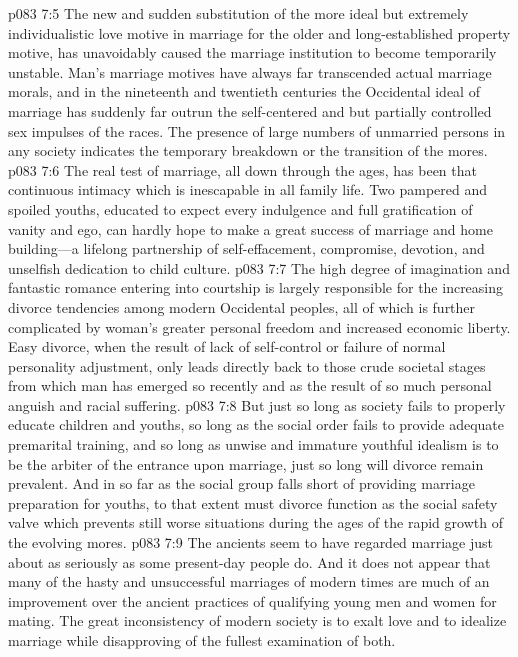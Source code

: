 \vs p083 7:5 The new and sudden substitution of the more ideal but extremely individualistic love motive in marriage for the older and long\hyp{}established property motive, has unavoidably caused the marriage institution to become temporarily unstable. Man’s marriage motives have always far transcended actual marriage morals, and in the nineteenth and twentieth centuries the Occidental ideal of marriage has suddenly far outrun the self\hyp{}centered and but partially controlled sex impulses of the races. The presence of large numbers of unmarried persons in any society indicates the temporary breakdown or the transition of the mores.
\vs p083 7:6 The real test of marriage, all down through the ages, has been that continuous intimacy which is inescapable in all family life. Two pampered and spoiled youths, educated to expect every indulgence and full gratification of vanity and ego, can hardly hope to make a great success of marriage and home building---a lifelong partnership of self\hyp{}effacement, compromise, devotion, and unselfish dedication to child culture.
\vs p083 7:7 The high degree of imagination and fantastic romance entering into courtship is largely responsible for the increasing divorce tendencies among modern Occidental peoples, all of which is further complicated by woman’s greater personal freedom and increased economic liberty. Easy divorce, when the result of lack of self\hyp{}control or failure of normal personality adjustment, only leads directly back to those crude societal stages from which man has emerged so recently and as the result of so much personal anguish and racial suffering.\plusone
\vs p083 7:8 But just so long as society fails to properly educate children and youths, so long as the social order fails to provide adequate premarital training, and so long as unwise and immature youthful idealism is to be the arbiter of the entrance upon marriage, just so long will divorce remain prevalent. And in so far as the social group falls short of providing marriage preparation for youths, to that extent must divorce function as the social safety valve which prevents still worse situations during the ages of the rapid growth of the evolving mores.
\pc \vs p083 7:9 The ancients seem to have regarded marriage just about as seriously as some present\hyp{}day people do. And it does not appear that many of the hasty and unsuccessful marriages of modern times are much of an improvement over the ancient practices of qualifying young men and women for mating. The great inconsistency of modern society is to exalt love and to idealize marriage while disapproving of the fullest examination of both.
